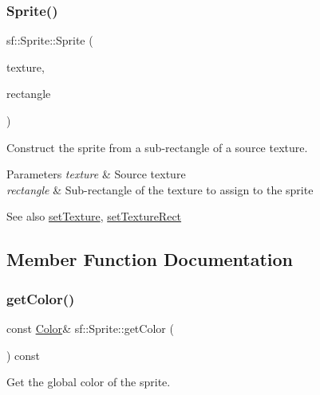 \subsubsection{\texorpdfstring{Sprite()}{Sprite()}\hspace{0.1cm}{\footnotesize\ttfamily [3/3]}}
{\footnotesize\ttfamily sf\+::\+Sprite\+::\+Sprite (\begin{DoxyParamCaption}\item[{const \hyperlink{classsf_1_1_texture}{Texture} \&}]{texture,  }\item[{const \hyperlink{classsf_1_1_rect}{Int\+Rect} \&}]{rectangle }\end{DoxyParamCaption})}



Construct the sprite from a sub-\/rectangle of a source texture. 


\begin{DoxyParams}{Parameters}
{\em texture} & Source texture \\
\hline
{\em rectangle} & Sub-\/rectangle of the texture to assign to the sprite\\
\hline
\end{DoxyParams}
\begin{DoxySeeAlso}{See also}
\hyperlink{classsf_1_1_sprite_a3729c88d88ac38c19317c18e87242560}{set\+Texture}, \hyperlink{classsf_1_1_sprite_a3fefec419a4e6a90c0fd54c793d82ec2}{set\+Texture\+Rect} 
\end{DoxySeeAlso}


\subsection{Member Function Documentation}
\mbox{\label{classsf_1_1_sprite_ac5f419f37b4e38f7a94186e3a3e303e1}} 
\subsubsection{\texorpdfstring{get\+Color()}{getColor()}}
{\footnotesize\ttfamily const \hyperlink{classsf_1_1_color}{Color}\& sf\+::\+Sprite\+::get\+Color (\begin{DoxyParamCaption}{ }\end{DoxyParamCaption}) const}



Get the global color of the sprite. 

